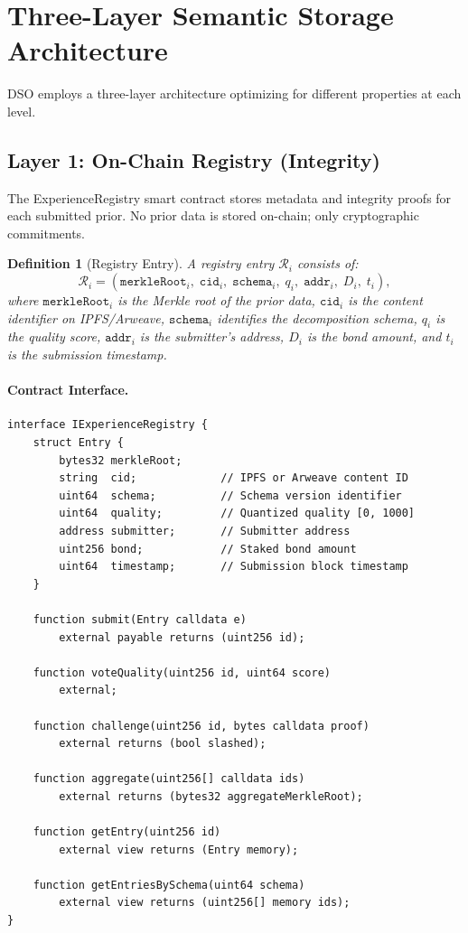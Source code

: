 \documentclass[11pt]{article}
\newtheorem{definition}{Definition}
\begin{document}
\section{Three-Layer Semantic Storage Architecture}
\label{sec:architecture}

DSO employs a three-layer architecture optimizing for different properties at
each level.

\subsection{Layer 1: On-Chain Registry (Integrity)}

The ExperienceRegistry smart contract stores metadata and integrity proofs for
each submitted prior. No prior data is stored on-chain; only cryptographic
commitments.

\begin{definition}[Registry Entry]
A registry entry $\mathcal{R}_i$ consists of:
\begin{equation}
    \mathcal{R}_i = \left(\texttt{merkleRoot}_i, \; \texttt{cid}_i, \;
    \texttt{schema}_i, \; q_i, \; \texttt{addr}_i, \; D_i, \; t_i\right),
\end{equation}
where $\texttt{merkleRoot}_i$ is the Merkle root of the prior data,
$\texttt{cid}_i$ is the content identifier on IPFS/Arweave, $\texttt{schema}_i$
identifies the decomposition schema, $q_i$ is the quality score, $\texttt{addr}_i$
is the submitter's address, $D_i$ is the bond amount, and $t_i$ is the
submission timestamp.
\end{definition}

\paragraph{Contract Interface.}
\begin{verbatim}
interface IExperienceRegistry {
    struct Entry {
        bytes32 merkleRoot;
        string  cid;             // IPFS or Arweave content ID
        uint64  schema;          // Schema version identifier
        uint64  quality;         // Quantized quality [0, 1000]
        address submitter;       // Submitter address
        uint256 bond;            // Staked bond amount
        uint64  timestamp;       // Submission block timestamp
    }

    function submit(Entry calldata e)
        external payable returns (uint256 id);

    function voteQuality(uint256 id, uint64 score)
        external;

    function challenge(uint256 id, bytes calldata proof)
        external returns (bool slashed);

    function aggregate(uint256[] calldata ids)
        external returns (bytes32 aggregateMerkleRoot);

    function getEntry(uint256 id)
        external view returns (Entry memory);

    function getEntriesBySchema(uint64 schema)
        external view returns (uint256[] memory ids);
}
\end{verbatim}
\end{document}
